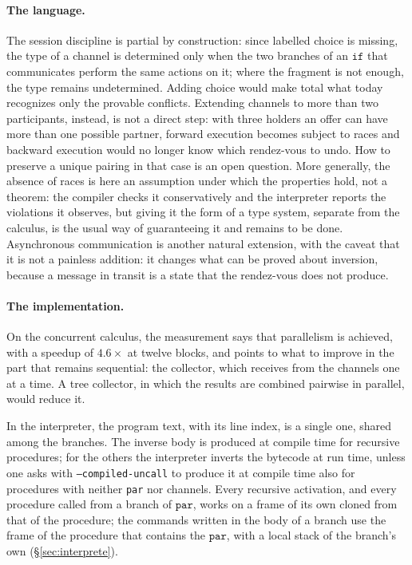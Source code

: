 \paragraph{The language.} The session discipline is partial by construction:
since labelled choice is missing, the type of a channel is determined only when
the two branches of an $\mathtt{if}$ that communicates perform the same actions on
it; where the fragment is not enough, the type remains undetermined. Adding choice would make total what today
recognizes only the provable conflicts. Extending channels to more than two
participants, instead, is not a direct step: with three holders an offer can
have more than one possible partner, forward execution becomes subject to races
and backward execution would no longer know which rendez-vous to undo.
How to preserve a unique pairing in that case is an open question. More
generally, the absence of
races is here an assumption under which the properties hold, not a theorem:
the compiler checks it conservatively and the interpreter reports the
violations it observes, but giving it the form of a type
system, separate from the calculus, is the usual way of guaranteeing it and remains to be done. Asynchronous communication is another natural
extension, with the caveat that it is not a painless addition: it changes what can
be proved about inversion, because a message in transit is a state that the
rendez-vous does not produce.

\paragraph{The implementation.} On the concurrent calculus, the measurement says that
parallelism is achieved, with a speedup of $4.6\times$ at twelve blocks, and
points to what to improve in the part that remains sequential: the collector,
which receives from the channels one at a time. A tree collector, in which the
results are combined pairwise in parallel, would reduce it.

In the interpreter, the program text, with its line index, is a
single one, shared among the branches. The inverse body is produced at compile time for
recursive procedures; for the others the interpreter inverts the bytecode at run
time, unless one asks with \texttt{--compiled-uncall} to
produce it at compile time also for procedures with neither \texttt{par} nor channels. Every
recursive activation, and every procedure called from a branch of $\mathtt{par}$, works on a
frame of its own cloned from that of the procedure; the commands written in the body
of a branch use the frame of the procedure that contains the $\mathtt{par}$, with
a local stack of the branch's own (\S\ref{sec:interprete}).

